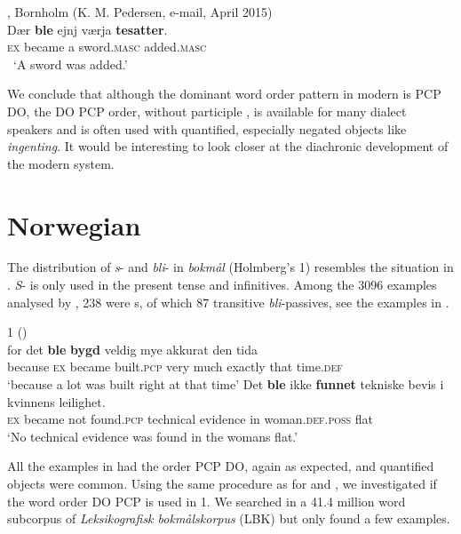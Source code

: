 \documentclass[output=paper]{LSP/langsci}
\begin{document}
\ea%
    \label{ex:engdahl:18}
    , Bornholm (K. M. Pedersen, e-mail, April 2015)\\
\gll     Dær   \textbf{ble}    ejnj   værja      \textbf{tesatter}.\\
 \textsc{ex} became a sword.\textsc{masc} added.\textsc{masc} \\\
 \glt ‘A sword was added.'
\z

\noindent We conclude that although the dominant word order pattern in modern  is PCP DO, the DO PCP order, without participle , is available for many dialect speakers and is often used with quantified, especially negated objects like \textit{ingenting}. It would be interesting to look closer at the diachronic development of the modern  system.

\section{Norwegian} %

The distribution of \textit{s}{}- and \textit{bli}{}- in  \textit{bokmål} (Holmberg’s  1) resembles the situation in . \textit{S}{}- is only used in the present tense and infinitives. Among the 3096 examples analysed by \citet{Laanemets2012}, 238 were s, of which 87 transitive \textit{bli}{}-passives, see the examples in .

\ea%
\label{ex:engdahl:19}
 1 (\citealt{Laanemets2012})\\
\ea
\gll for  det  \textbf{ble}  \textbf{bygd}  veldig   mye   akkurat   den   tida    \\
     {because} \textsc{ex}  became  built.\textsc{pcp}  very  much  exactly    that  time.\textsc{def}  \\
     \glt ‘because a lot was built right at that time'
\ex
\gll     Det  \textbf{ble}   ikke   \textbf{funnet}  tekniske   bevis  i   kvinnens   leilighet.\\
  \textsc{ex}    became  not  found.\textsc{pcp}  technical  evidence    in woman.\textsc{def.poss} {flat}\\
  \glt ‘No technical evidence was found in the  womans  flat.'
\z
\z

\noindent All the examples in \citet{Laanemets2012} had the order PCP DO, again as expected, and quantified objects were common. Using the same procedure as for  and , we investigated if the word order DO PCP is used in  1. We searched in a 41.4 million word subcorpus of \textit{Leksikografisk bokmålskorpus} (LBK) but only found a few examples.
\end{document}
